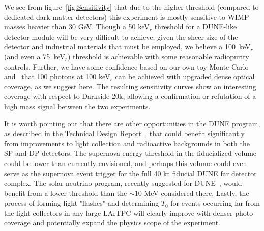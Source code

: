 \documentclass[a4paper,11pt]{article}
\newcommand{\todo}[1]{{\tt \color{red}#1}}
\begin{document}
We see from figure~\ref{fig:Sensitivity} that due to the higher threshold (compared to dedicated dark matter detectors) this experiment is mostly sensitive to WIMP masses heavier than 30 GeV. Though a 50 keV$_r$ threshold for a DUNE-like detector module will be very difficult to achieve, given the sheer size of the detector and industrial materials that must be employed, we believe a 100~keV$_r$ (and even a 75~keV$_r$) threshold is achievable with some reasonable radiopurity controls. Further, we have some confidence based on our own toy Monte Carlo and~\cite{privateconv:flavio} that 100 photons at 100 keV$_r$ can be achieved with upgraded dense optical coverage, as we suggest here. The resulting sensitivity curves show an interesting coverage with respect to Darkside-20k, allowing a confirmation or refutation of a high mass signal between the two experiments. %


It is worth pointing out that there are other opportunities in the DUNE program, as described in the Technical Design Report~\cite{TDR}, that could benefit significantly from improvements to light collection and radioactive backgrounds in both the SP and DP detectors. The supernova energy threshold in the fiducialized volume could be lower than currently envisioned, and perhaps this volume could even serve as the supernova event trigger for the full 40 kt fiducial DUNE far detector complex. The solar neutrino program, recently suggested for DUNE~\cite{beacom_snu}, would benefit from a lower threshold than the  $\sim10$ MeV considered there. Lastly, the process of forming light "flashes" and determining $T_0$ for events occurring far from the light collectors in any large LArTPC will clearly improve with denser photo coverage and potentially  expand the physics scope of the experiment.
\end{document}
